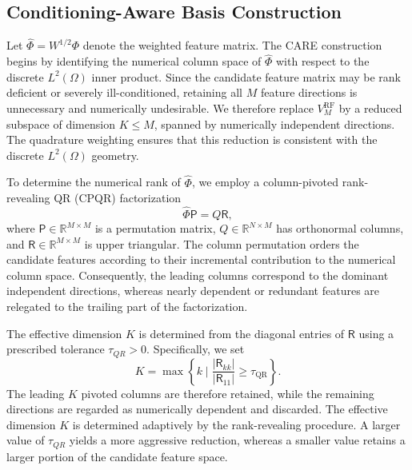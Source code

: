 \documentclass[10pt,reqno]{amsart}
\theoremstyle{remark}
\theoremstyle{definition}
\begin{document}
\subsection{Conditioning-Aware Basis Construction}
Let $\widehat{\Phi}  = W^{1/2} \Phi$ denote the weighted feature matrix. The CARE construction begins by identifying the numerical column space of $\widehat{\Phi}$ with respect to the discrete $L^2(\Omega)$ inner product. Since the candidate feature matrix may be rank deficient or severely ill-conditioned, retaining all $M$ feature directions is unnecessary and numerically undesirable. We therefore replace $V_{M}^{\text{RF}}$ by a reduced subspace of dimension $K \leq M$, spanned by numerically independent directions. The quadrature weighting ensures that this reduction is consistent with the discrete $L^2(\Omega)$ geometry.

To determine the numerical rank of $\widehat{\Phi}$, we employ a column-pivoted rank-revealing QR (CPQR) factorization
$$
  \widehat{\Phi} \mathsf{P} = Q \mathsf{R},
$$
where $\mathsf{P} \in \mathbb{R}^{M \times M}$ is a permutation matrix, $Q \in \mathbb{R}^{N \times M}$ has orthonormal columns, and $\mathsf{R} \in \mathbb{R}^{M \times M}$ is upper triangular. The column permutation orders the candidate features according to their incremental contribution to the numerical column space. Consequently, the leading columns correspond to the dominant independent directions, whereas nearly dependent or redundant features are relegated to the trailing part of the factorization.

The effective dimension $K$ is determined from the diagonal entries of $\mathsf{R}$ using a prescribed tolerance $\tau_{QR}>0$. Specifically, we set
\begin{equation}
  K=\max\left\{k \mid \frac{\left|\mathsf{R}_{kk}\right|}{\left|\mathsf{R}_{11}\right|}\geq\tau_{\mathrm{QR}} \right\}.
\end{equation}
The leading $K$ pivoted columns are therefore retained, while the remaining directions are regarded as numerically dependent and discarded. The effective dimension $K$ is determined adaptively by the rank-revealing procedure. A larger value of $\tau_{QR}$ yields a more aggressive reduction, whereas a smaller value retains a larger portion of the candidate feature space.
\end{document}
